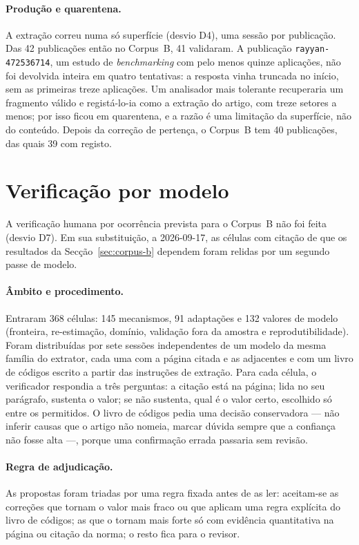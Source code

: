 \paragraph{Produção e quarentena.} A extração correu numa só superfície
(desvio D4), uma sessão por publicação. Das 42 publicações então no
Corpus~B, 41 validaram. A publicação \texttt{rayyan-472536714}, um estudo de
\emph{benchmarking} com pelo menos quinze aplicações, não foi devolvida
inteira em quatro tentativas: a resposta vinha truncada no início, sem as
primeiras treze aplicações. Um analisador mais tolerante recuperaria um
fragmento válido e registá-lo-ia como a extração do artigo, com treze setores
a menos; por isso ficou em quarentena, e a razão é uma limitação da
superfície, não do conteúdo. Depois da correção de pertença, o Corpus~B tem
40 publicações, das quais 39 com registo.

\section{Verificação por modelo}
\label{sec:apB-verificacao}

A verificação humana por ocorrência prevista para o Corpus~B não foi feita
(desvio D7). Em sua substituição, a 2026-09-17, as células com citação de que
os resultados da Secção~\ref{sec:corpus-b} dependem foram relidas por um
segundo passe de modelo.

\paragraph{Âmbito e procedimento.} Entraram 368 células: 145 mecanismos, 91
adaptações e 132 valores de modelo (fronteira, re-estimação, domínio,
validação fora da amostra e reprodutibilidade). Foram distribuídas por sete
sessões independentes de um modelo da mesma família do extrator, cada uma
com a página citada e as adjacentes e com um livro de códigos escrito a partir
das instruções de extração. Para cada célula, o verificador respondia a três
perguntas: a citação está na página; lida no seu parágrafo, sustenta o valor;
se não sustenta, qual é o valor certo, escolhido só entre os permitidos. O
livro de códigos pedia uma decisão conservadora --- não inferir causas que o
artigo não nomeia, marcar dúvida sempre que a confiança não fosse alta ---,
porque uma confirmação errada passaria sem revisão.

\paragraph{Regra de adjudicação.} As propostas foram triadas por uma regra
fixada antes de as ler: aceitam-se as correções que tornam o valor mais fraco
ou que aplicam uma regra explícita do livro de códigos; as que o tornam mais
forte só com evidência quantitativa na página ou citação da norma; o resto
fica para o revisor.

